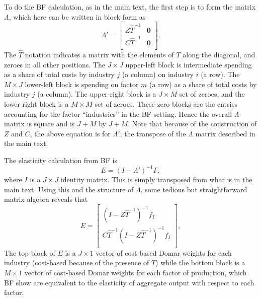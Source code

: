 To do the BF calculation, as in the main text, the first step is to form the matrix $\Lambda$, which here can be written in block form as
\begin{equation*}
	\Lambda' = 	\begin{bmatrix}
		Z\hat{T}^{-1} & \mathbf{0}  \\
		C\hat{T}^{-1} &\mathbf{0}  \\
	\end{bmatrix}.
\end{equation*}
The $\hat{T}$ notation indicates a matrix with the elements of $T$ along the diagonal, and zeroes in all other positions. The $J\times J$ upper-left block is intermediate spending as a share of total costs by industry $j$ (a column) on industry $i$ (a row). The $M\times J$ lower-left block is spending on factor $m$ (a row) as a share of total costs by industry $j$ (a column). The upper-right block is a $J\times M$ set of zeroes, and the lower-right block is a $M\times M$ set of zeroes. These zero blocks are the entries accounting for the factor ``industries'' in the BF setting. Hence the overall $\Lambda$ matrix is square and is $J+M$ by $J+M$. Note that because of the construction of $Z$ and $C$, the above equation is for $\Lambda'$, the transpose of the $\Lambda$ matrix described in the main text.

The elasticity calculation from BF is
\begin{equation*}
	E = (I - \Lambda')^{-1}\Gamma, 
\end{equation*}
where $I$ is a $J \times J$ identity matrix. This is simply transposed from what is in the main text. Using this and the structure of $\Lambda$, some tedious but straightforward matrix algebra reveals that
\begin{equation*}
	E = \begin{bmatrix}
		\left(I-Z\hat{T}^{-1}\right)^{-1}f_I \\
		C\hat{T}^{-1} \left(I-Z\hat{T}^{-1}\right)^{-1}f_I \\
	\end{bmatrix},
\end{equation*}
The top block of $E$ is a $J \times 1$ vector of cost-based Domar weights for each industry (cost-based because of the presence of $T$) while the bottom block is a $M \times 1$ vector of cost-based Domar weights for each factor of production, which BF show are equivalent to the elasticity of aggregate output with respect to each factor.

